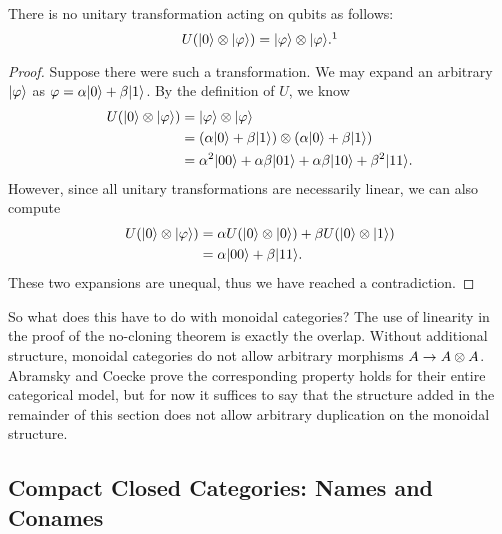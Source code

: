 \begin{theorem}
    There is no unitary transformation acting on qubits as follows:
    \[ U(\ket{0}\tensor\ket{\varphi}) = \ket{\varphi}\tensor\ket{\varphi}.\footnotemark \]
\end{theorem}
\begin{proof}
    Suppose there were such a transformation. We may expand an arbitrary ${\left\vert{\varphi}\right\rangle}$
    as $\varphi = \alpha{\left\vert{0}\right\rangle} + \beta{\left\vert{1}\right\rangle}$. By the definition of $U$, we know
    \begin{align*} 
        U({\left\vert{0}\right\rangle} \otimes {\left\vert{\varphi}\right\rangle})
        &= {\left\vert{\varphi}\right\rangle} \otimes {\left\vert{\varphi}\right\rangle} \\
        &= (\alpha{\left\vert{0}\right\rangle} + \beta{\left\vert{1}\right\rangle}) \otimes (\alpha{\left\vert{0}\right\rangle} + \beta{\left\vert{1}\right\rangle}) \\
        &= \alpha^2 {\left\vert{00}\right\rangle} + \alpha\beta{\left\vert{01}\right\rangle} + \alpha\beta{\left\vert{10}\right\rangle} + \beta^2{\left\vert{11}\right\rangle}.
    \end{align*}
    However, since all unitary transformations are necessarily linear, we can also compute
    \begin{align*}
        U({\left\vert{0}\right\rangle} \otimes {\left\vert{\varphi}\right\rangle})
        &= \alpha U({\left\vert{0}\right\rangle} \otimes {\left\vert{0}\right\rangle}) + \beta U({\left\vert{0}\right\rangle} \otimes {\left\vert{1}\right\rangle}) \\
        &= \alpha {\left\vert{00}\right\rangle} + \beta {\left\vert{11}\right\rangle}.
    \end{align*}
    These two expansions are unequal, thus we have reached a contradiction. 
\end{proof}

So what does this have to do with monoidal categories? 
The use of linearity in the proof of the no-cloning theorem is exactly the overlap.
Without additional structure, monoidal categories do not allow arbitrary
morphisms $A \rightarrow A \otimes A$. Abramsky and Coecke\cite{abramsky2009categorical}
prove the corresponding property holds for their entire categorical model,
but for now it suffices to say that the structure added in the remainder
of this section does not allow arbitrary duplication on the monoidal structure.

\subsection{Compact Closed Categories: Names and Conames}

